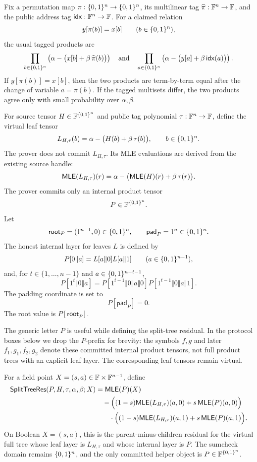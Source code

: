 Fix a permutation map \(\pi:\{0,1\}^n\to\{0,1\}^n\), its multilinear tag
\(\widehat\pi:\mathbb{F}^n\to\mathbb{F}\), and the public address tag
\(\mathsf{idx}:\mathbb{F}^n\to\mathbb{F}\).  For a claimed relation
\[
  y[\pi(b)]=x[b]
  \qquad(b\in\{0,1\}^n),
\]
the usual tagged products are
\[
  \prod_{b\in\{0,1\}^n}
    \left(\alpha-\bigl(x[b]+\beta\,\widehat\pi(b)\bigr)\right)
  \quad\text{and}\quad
  \prod_{a\in\{0,1\}^n}
    \left(\alpha-\bigl(y[a]+\beta\,\mathsf{idx}(a)\bigr)\right).
\]
If \(y[\pi(b)]=x[b]\), then the two products are term-by-term equal after the
change of variable \(a=\pi(b)\).  If the tagged multisets differ, the two
products agree only with small probability over \(\alpha,\beta\).

For source tensor \(H\in\mathbb{F}^{\{0,1\}^n}\) and public tag polynomial
\(\tau:\mathbb{F}^n\to\mathbb{F}\), define the virtual leaf tensor
\[
  L_{H,\tau}(b)
  =
  \alpha-\bigl(H(b)+\beta\,\tau(b)\bigr),
  \qquad b\in\{0,1\}^n.
\]
The prover does not commit \(L_{H,\tau}\).  Its MLE evaluations are derived
from the existing source handle:
\[
  \mathsf{MLE}(L_{H,\tau})(r)
  =
  \alpha-\bigl(\mathsf{MLE}(H)(r)+\beta\,\tau(r)\bigr).
\]
The prover commits only an internal product tensor
\[
  P\in\mathbb{F}^{\{0,1\}^n}.
\]
Let
\[
  \mathsf{root}_P=(1^{n-1},0)\in\{0,1\}^n,
  \qquad
  \mathsf{pad}_P=1^n\in\{0,1\}^n.
\]
The honest internal layer for leaves \(L\) is defined by
\[
  P[0\Vert a]=L[a\Vert0]L[a\Vert1]
  \qquad(a\in\{0,1\}^{n-1}),
\]
and, for \(t\in\{1,\ldots,n-1\}\) and
\(a\in\{0,1\}^{n-t-1}\),
\[
  P[1^t\Vert0\Vert a]
  =
  P[1^{t-1}\Vert0\Vert a\Vert0]
  P[1^{t-1}\Vert0\Vert a\Vert1].
\]
The padding coordinate is set to
\[
  P[\mathsf{pad}_P]=0.
\]
The root value is \(P[\mathsf{root}_P]\).

The generic letter \(P\) is useful while defining the split-tree residual.  In
the protocol boxes below we drop the \(P\)-prefix for brevity: the symbols
\(f,g\) and later \(f_1,g_1,f_2,g_2\) denote these committed internal product
tensors, not full product trees with an explicit leaf layer.  The corresponding
leaf tensors remain virtual.

For a field point \(X=(s,a)\in\mathbb{F}\times\mathbb{F}^{n-1}\), define
\[
\begin{aligned}
  \mathsf{SplitTreeRes}(P,H,\tau,\alpha,\beta;X)
  &=
  \mathsf{MLE}(P)(X)\\
  &\quad-
  \Bigl((1-s)\mathsf{MLE}(L_{H,\tau})(a,0)+s\,\mathsf{MLE}(P)(a,0)\Bigr)\\
  &\qquad\cdot
  \Bigl((1-s)\mathsf{MLE}(L_{H,\tau})(a,1)+s\,\mathsf{MLE}(P)(a,1)\Bigr).
\end{aligned}
\]
On Boolean \(X=(s,a)\), this is the parent-minus-children residual for the
virtual full tree whose leaf layer is \(L_{H,\tau}\) and whose internal layer is
\(P\).  The sumcheck domain remains \(\{0,1\}^n\), and the only committed helper
object is \(P\in\mathbb{F}^{\{0,1\}^n}\).

